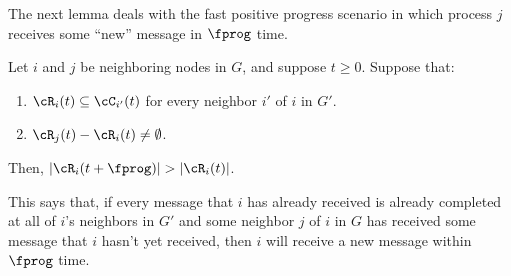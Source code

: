 The next lemma deals with the fast positive progress scenario in which  process $j$ receives some ``new'' message in $\fprog$ time.
\begin{lemma}
Let $i$ and $j$ be neighboring nodes in $G$, and suppose $t \geq 0$. Suppose that:
\begin{enumerate}
\item $\cR_i(t) \subseteq \cC_{i'}(t)$ for every neighbor $i'$ of $i$ in $G'$.
\item $\cR_j(t) - \cR_i(t) \not= \emptyset$.
\end{enumerate}

Then,  $|\cR_i(t + \fprog) | > |\cR_i(t)|$.
\label{lemma: z-neighborhood prog bound}
\end{lemma}
This says that, if every message that $i$ has already received is already completed at all of $i$'s
neighbors in $G'$ and some neighbor $j$ of $i$ in $G$ has received some message that $i$ hasn't yet received, then $i$ will
receive a new message within $\fprog$ time.


